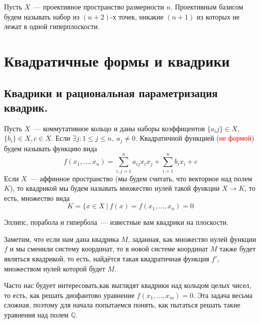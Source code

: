 \documentclass[11pt]{report}
\begin{document}
    \begin{definition}
        Пусть $X$~--- проективное пространство размерности $n$.  Проективным базисом будем называть набор из  $(n + 2)$-х точек, никакие $(n + 1)$ из которых не лежат в одной  гиперплоскости.
    \end{definition}

    \section{Квадратичные формы и квадрики}
    \subsection{Квадрики и рациональная параметризация квадрик.}
    \begin{definition}
        Пусть $X$~--- коммутативное кольцо и даны наборы коэффицентов $\{ a_i j \} \in X$, $\{ b_i \} \in X, c \in X$.
        Если $\exists j\colon 1 \le j \le n, \ a_j \neq 0$.
        Квадратичной функцией (\textcolor{red}{не формой})  будем называть функцию вида
        \[ f(x_1, \ldots, x_n) = \sum\limits_{i, j = 1}^{n} a_{i j} x_i x_j + \sum\limits_{i = 1}^{n} b_i x_i + c  \]
        Если $X$~--- аффинное пространство (мы будем считать, что векторное над полем $K$), то квадрикой мы будем называть множество нулей такой функции $X \to K$, то есть, множество вида
        \[ K = \{ x \in X \ | \ f(x) = f(x_1, \ldots, x_n) = 0 \]
    \end{definition}
    \begin{example}
        Эллипс, порабола и гипербола~--- известные вам квадрики на плоскости.
    \end{example}

    \begin{remark}
        Заметим, что если нам дана квадрика $M$, заданная, как множество нулей функции $f$ и мы сменили систему координат, то
        в новой системе координат $M$ также будет являться квадрикой, то есть, найдётся такая квадратичная функция $f'$, множеством нулей которой
        будет $M$.
    \end{remark}
    Часто нас будует интересовать,как выглядят квадрики над кольцом целых чисел, то есть, как решать диофантово уравнение
    $f(x_1, \ldots, x_m) = 0$. Эта задача весьма сложная, поэтому для начала попытаемся понять, как пытаться решать такие уравнения
    над полем $\mathbb{Q}$.
\end{document}
